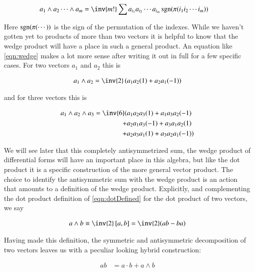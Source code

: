 \begin{align}\label{eqn:wedge}
a_1 \wedge a_2 \cdots \wedge a_m
&= \inv{m!} \sum a_{i_1} a_{i_2} \cdots a_{i_m} \sgn(\pi(i_1 i_2 \cdots i_m))
\end{align}

Here $\operatorname{sgn}(\pi(\cdots))$ is the sign of the permutation of the indexes.  While we haven't gotten yet to products of more than two vectors it is helpful to know that the wedge product will have a place in such a general product.   An equation like \ref{eqn:wedge} makes a lot more sense after writing it out in full for a few specific cases.  For two vectors $a_1$ and $a_2$ this is

\begin{align}\label{eqn:wedgeTwo}
a_1 \wedge a_2 = \inv{2}
\left( a_1 a_2 (1) + a_2 a_1 (-1) \right)
\end{align}

and for three vectors this is

\begin{align*}
a_1 \wedge a_2 \wedge a_3 = \inv{6}
(
&a_1 a_2 a_3 (1) + a_1 a_3 a_2 (-1) \\
+&a_2 a_1 a_3 (-1) + a_3 a_1 a_2 (1) \\
+&a_2 a_3 a_1 (1) + a_3 a_2 a_1 (-1) )
\end{align*}

We will see later that this completely antisymmetrized sum, the wedge product of differential forms will have an important place in this algebra, but like the dot product it is a specific construction of the more general vector product.  The choice to identify the antisymmetric sum with the wedge product is an action that amounts to a definition of the wedge product.  Explicitly, and complementing
the dot product definition of \ref{eqn:dotDefined} for the dot product
of two vectors, we say

\begin{align}\label{eqn:wedgeDefined}
a \wedge b \equiv \inv{2} \antisymmetric{a}{b} = \inv{2} ( a b - b a )
\end{align}

Having made this definition, the symmetric and antisymmetric decomposition of two vectors leaves us with a peculiar looking hybrid construction:

\begin{align}\label{eqn:dotPlusWedge}
a b %
&= a \cdot b + a \wedge b
\end{align}

